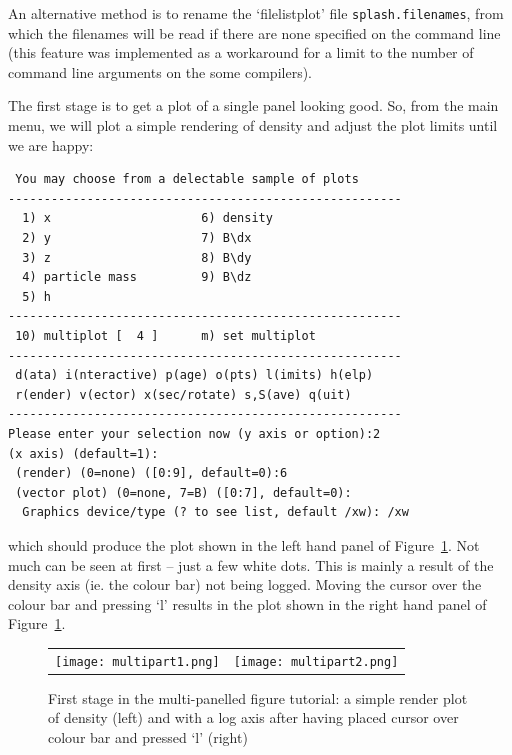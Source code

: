 \documentclass[a4paper,11pt]{article}
\begin{document}
An alternative method is to rename the `filelistplot' file \verb+splash.filenames+, from which the filenames will be read if there are none specified on the command line (this feature was implemented as a workaround for a limit to the number of command line arguments on the some compilers).

 The first stage is to get a plot of a single panel looking good. So, from the main menu, we will plot a simple rendering of density and adjust the plot limits until we are happy:
\begin{verbatim}
 You may choose from a delectable sample of plots 
-------------------------------------------------------
  1) x                     6) density             
  2) y                     7) B\dx                
  3) z                     8) B\dy                
  4) particle mass         9) B\dz                
  5) h                   
-------------------------------------------------------
 10) multiplot [  4 ]      m) set multiplot 
-------------------------------------------------------
 d(ata) i(nteractive) p(age) o(pts) l(imits) h(elp)
 r(ender) v(ector) x(sec/rotate) s,S(ave) q(uit)
-------------------------------------------------------
Please enter your selection now (y axis or option):2
(x axis) (default=1):
 (render) (0=none) ([0:9], default=0):6
 (vector plot) (0=none, 7=B) ([0:7], default=0):
  Graphics device/type (? to see list, default /xw): /xw
\end{verbatim}
which should produce the plot shown in the left hand panel of Figure~\ref{fig:multipart1}. Not much can be seen at first -- just a few white dots. This is mainly a result of the density axis (ie. the colour bar) not being logged. Moving the cursor over the colour bar and pressing `l' results in the plot shown in the right hand panel of Figure~\ref{fig:multipart1}.
\begin{figure}[h]
\begin{center}
\begin{tabular}{cc}
\texttt{[image: multipart1.png]} &
\texttt{[image: multipart2.png]}
\end{tabular}
\caption{First stage in the multi-panelled figure tutorial: a simple render plot of density (left) and with a log axis after having placed cursor over colour bar and pressed `l' (right)}
\label{fig:multipart1}
\end{center}
\end{figure}
\end{document}
